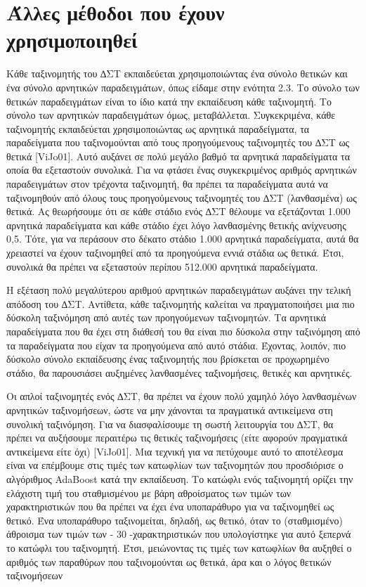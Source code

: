 \section{Άλλες μέθοδοι που έχουν χρησιμοποιηθεί}\label{sec:othermethods}

Κάθε ταξινομητής του ∆ΣΤ εκπαιδεύεται χρησιμοποιώντας ένα σύνολο θετικών και ένα
σύνολο αρνητικών παραδειγμάτων, όπως είδαμε στην ενότητα 2.3. Το σύνολο των θετικών
παραδειγμάτων είναι το ίδιο κατά την εκπαίδευση κάθε ταξινομητή. Το σύνολο των αρνητικών
παραδειγμάτων όμως, μεταβάλλεται. Συγκεκριμένα, κάθε ταξινομητής εκπαιδεύεται
χρησιμοποιώντας ως αρνητικά παραδείγματα, τα παραδείγματα που ταξινομούνται από τους
προηγούμενους ταξινομητές του ∆ΣΤ ως θετικά [ViJo01]. Αυτό αυξάνει σε πολύ μεγάλο βαθμό τα
αρνητικά παραδείγματα τα οποία θα εξεταστούν συνολικά. Για να φτάσει ένας συγκεκριμένος
αριθμός αρνητικών παραδειγμάτων στον τρέχοντα ταξινομητή, θα πρέπει τα παραδείγματα αυτά
να ταξινομηθούν από όλους τους προηγούμενους ταξινομητές του ∆ΣΤ (λανθασμένα) ως θετικά.
Ας θεωρήσουμε ότι σε κάθε στάδιο ενός ∆ΣΤ θέλουμε να εξετάζονται 1.000 αρνητικά
παραδείγματα και κάθε στάδιο έχει λόγο λανθασμένης θετικής ανίχνευσης 0,5. Τότε, για να
περάσουν στο δέκατο στάδιο 1.000 αρνητικά παραδείγματα, αυτά θα χρειαστεί να έχουν
ταξινομηθεί από τα προηγούμενα εννιά στάδια ως θετικά. Έτσι, συνολικά θα πρέπει να εξεταστούν
περίπου 512.000 αρνητικά παραδείγματα.

Η εξέταση πολύ μεγαλύτερου αριθμού αρνητικών παραδειγμάτων αυξάνει την τελική απόδοση
του ∆ΣΤ. Αντίθετα, κάθε ταξινομητής καλείται να πραγματοποιήσει μια πιο δύσκολη ταξινόμηση
από αυτές των προηγούμενων ταξινομητών. Τα αρνητικά παραδείγματα που θα έχει στη διάθεσή
του θα είναι πιο δύσκολα στην ταξινόμηση από τα παραδείγματα που είχαν τα προηγούμενα από
αυτό στάδια. Έχοντας, λοιπόν, πιο δύσκολο σύνολο εκπαίδευσης ένας ταξινομητής που βρίσκεται
σε προχωρημένο στάδιο, θα παρουσιάσει αυξημένες λανθασμένες ταξινομήσεις, θετικές και
αρνητικές.

Οι απλοί ταξινομητές ενός ∆ΣΤ, θα πρέπει να έχουν πολύ χαμηλό λόγο λανθασμένων
αρνητικών ταξινομήσεων, ώστε να μην χάνονται τα πραγματικά αντικείμενα στη συνολική
ταξινόμηση. Για να διασφαλίσουμε τη σωστή λειτουργία του ∆ΣΤ, θα πρέπει να αυξήσουμε
περαιτέρω τις θετικές ταξινομήσεις (είτε αφορούν πραγματικά αντικείμενα είτε όχι) [ViJo01]. Μια
τεχνική για να πετύχουμε αυτό το αποτέλεσμα είναι να επέμβουμε στις τιμές των κατωφλίων των
ταξινομητών που προσδιόρισε ο αλγόριθμος AdaBoost κατά την εκπαίδευση. Το κατώφλι ενός
ταξινομητή ορίζει την ελάχιστη τιμή του σταθμισμένου με βάρη αθροίσματος των τιμών των
χαρακτηριστικών που θα πρέπει να έχει ένα υποπαράθυρο για να ταξινομηθεί ως θετικό. Ένα
υποπαράθυρο ταξινομείται, δηλαδή, ως θετικό, όταν το (σταθμισμένο) άθροισμα των τιμών των
- 30 -χαρακτηριστικών που υπολογίστηκε για αυτό ξεπερνά το κατώφλι του ταξινομητή. Έτσι,
μειώνοντας τις τιμές των κατωφλίων θα αυξηθεί ο αριθμός των παραθύρων που ταξινομούνται ως
θετικά, άρα και ο λόγος θετικών ταξινομήσεων

